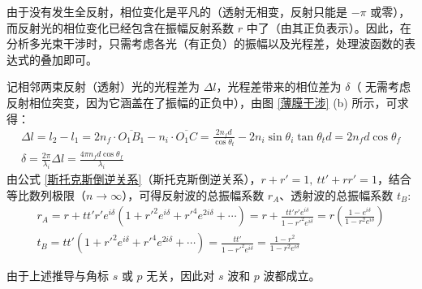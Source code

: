 \documentclass[UTF8]{report}
\theoremstyle{MyLineTheoremStyle} %
\theoremstyle{MyBlockTheoremStyle} %
\theoremstyle{MySubsubsectionStyle} %
\begin{document}
由于没有发生全反射，相位变化是平凡的（透射无相变，反射只能是 $-\pi$ 或零），而反射光的相位变化已经包含在振幅反射系数 $r$ 中了（由其正负表示）。因此，在分析多光束干涉时，只需考虑各光（有正负）的振幅以及光程差，处理波函数的表达式的叠加即可。

记相邻两束反射（透射）光的光程差为 $\Delta l$，光程差带来的相位差为 $\delta$（{\color{red} 无需考虑反射相位突变，因为它涵盖在了振幅的正负中}），由图 \ref{薄膜干涉} (b) 所示，可求得：
\begin{gather}
    \Delta l = l_2 - l_1 = 2 n_f\cdot  \overline{O_1B_1} - n_i\cdot  \overline{O_1 C} = \frac{2 n_f d}{\cos \theta_t} - 2 n_i \sin \theta_i \tan \theta_t d = 2 n_f d \cos \theta_f \\ 
    \delta = \frac{2 \pi}{\lambda_i} \Delta l = \frac{4 \pi n_f d \cos \theta_f}{\lambda_i}
\end{gather}
由公式 \ref{斯托克斯倒逆关系}（斯托克斯倒逆关系），$r + r' = 1,\ tt' + rr' =1$，结合等比数列极限（$n \to \infty$），可得反射波的总振幅系数 $r_A$、透射波的总振幅系数 $t_B$:
\begin{gather}
    r_A 
    = r + tt'r' e^{i \delta}\left( 1 + r'^2e^{i \delta} +  r'^4e^{2 i \delta} + \cdots\right) 
    = r +  \frac{tt'r'e^{i \delta}}{1 - r'^2e^{i \delta}} 
    = r \left( \frac{1 - e^{i \delta}}{1 - r^2 e^{i \delta}} \right)
    \\ 
    t_B 
    =  tt' \left( 1 + r'^2e^{i \delta} +  r'^4e^{2 i \delta} + \cdots \right) = \frac{tt'}{1 - r'^2e^{i \delta}} = \frac{1 - r^2}{1 - r^2 e^{i \delta}}
\end{gather}

由于上述推导与角标 $s$ 或 $p$ 无关，因此对 $s$ 波和 $p$ 波都成立。
\end{document}
